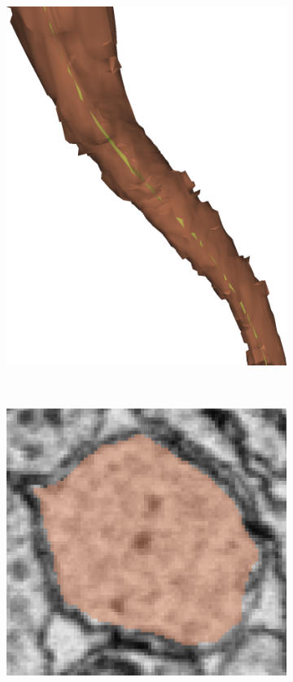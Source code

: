 \begin{figure}[htpb]
\begin{subfigure}[b]{\mywidth}
		\includegraphics[width=\textwidth]{data/images/interpolation/spline_skel.png}
		\caption{\label{fig:skel_spline}}
	\end{subfigure}\\
	\hspace{3mm}
	\begin{subfigure}[b]{\mywidth}
		\centering
		\includegraphics[width=\textwidth]{data/images/interpolation/seg_slice.png}

\end{subfigure}
\end{figure}
